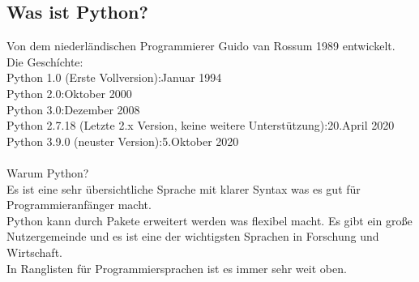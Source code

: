 \documentclass{article}
\begin{document}
\subsection{Was ist Python?}
Von dem niederländischen Programmierer Guido van Rossum 1989 entwickelt.\\
Die Geschíchte:\\
Python 1.0 (Erste Vollversion):Januar 1994\\
Python 2.0:Oktober 2000\\
Python 3.0:Dezember 2008\\
Python 2.7.18 (Letzte 2.x Version, keine weitere Unterstützung):20.April 2020\\
Python 3.9.0 (neuster Version):5.Oktober 2020\\\\
Warum Python?\\
Es ist eine sehr übersichtliche Sprache mit klarer Syntax was es gut für Programmieranfänger macht.\\
Python kann durch Pakete erweitert werden was flexibel macht. Es gibt ein große Nutzergemeinde und es ist eine der wichtigsten Sprachen in Forschung und Wirtschaft.\\
In Ranglisten für Programmiersprachen ist es immer sehr weit oben.\\
\end{document}
